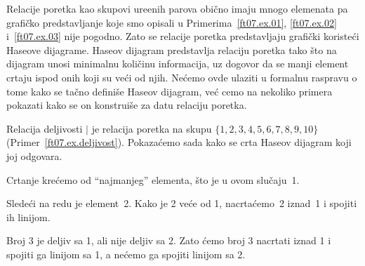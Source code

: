 Relacije poretka kao skupovi ure\dj enih parova obi\v cno imaju mnogo elemenata pa grafi\v cko predstavljanje koje smo opisali
u Primerima~\ref{ft07.ex.01}, \ref{ft07.ex.02} i~\ref{ft07.ex.03} nije pogodno. Zato se relacije poretka predstavljaju
grafi\v cki koriste\'ci Haseove dijagrame. Haseov dijagram predstavlja relaciju poretka tako \v sto na dijagram unosi minimalnu
koli\v cinu informacija, uz dogovor da se manji element crtaju ispod onih koji su ve\'ci od njih. Ne\'cemo ovde ulaziti
u formalnu raspravu o tome kako se ta\v cno defini\v se Haseov dijagram, ve\'c cemo na nekoliko primera pokazati kako se on
konstrui\v se za datu relaciju poretka.

\begin{EX}\label{ft07.ex.deljivost-1-10}
  Relacija deljivosti $\mid$ je relacija poretka na skupu $\{1, 2, 3, 4, 5, 6, 7, 8, 9, 10\}$
  (Primer~\ref{ft07.ex.deljivost}). Pokaza\'cemo sada kako se crta Haseov dijagram koji joj odgovara.
\end{EX}

\bigskip

\noindent
\begin{minipage}{3in}
  Crtanje kre\'cemo od ``najmanjeg'' elementa, \v sto je u ovom slu\v caju~1.
\end{minipage}
\hfill
\begin{minipage}{2.5in}
  \begin{center}
    
  \end{center}
\end{minipage}

\bigskip

\noindent
\begin{minipage}{3in}
  Slede\'ci na redu je element~2. Kako je 2 ve\'ce od 1, nacrta\'cemo~2 iznad~1 i spojiti ih linijom.
\end{minipage}
\hfill
\begin{minipage}{2.5in}
  \begin{center}
    
  \end{center}
\end{minipage}

\bigskip

\noindent
\begin{minipage}{3in}
  Broj 3 je deljiv sa 1, ali nije deljiv sa 2. Zato \'cemo broj 3 nacrtati iznad 1 i spojiti ga linijom sa 1, a ne\'cemo
  ga spojiti linijom sa 2.
\end{minipage}
\hfill
\begin{minipage}{2.5in}
  \begin{center}
    
  \end{center}
\end{minipage}

